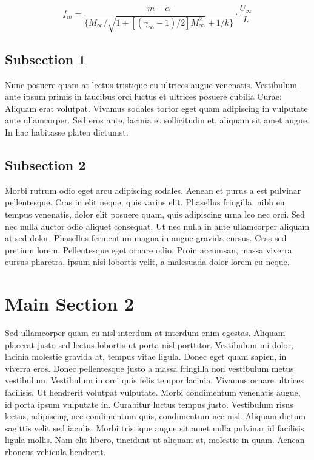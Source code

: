 \begin{equation}
f_m = \frac{m-\alpha}{\{M_{\infty}/\sqrt{1+[(\gamma_{\infty}-1)/2]M_{\infty}^2}+1/k\}} \cdot \frac{U_\infty}{L}
\label{eq:freq}
\end{equation}


\subsection{Subsection 1}

Nunc posuere quam at lectus tristique eu ultrices augue venenatis. Vestibulum ante ipsum primis in faucibus orci luctus et ultrices posuere cubilia Curae; Aliquam erat volutpat. Vivamus sodales tortor eget quam adipiscing in vulputate ante ullamcorper. Sed eros ante, lacinia et sollicitudin et, aliquam sit amet augue. In hac habitasse platea dictumst.


\subsection{Subsection 2}
Morbi rutrum odio eget arcu adipiscing sodales. Aenean et purus a est pulvinar pellentesque. Cras in elit neque, quis varius elit. Phasellus fringilla, nibh eu tempus venenatis, dolor elit posuere quam, quis adipiscing urna leo nec orci. Sed nec nulla auctor odio aliquet consequat. Ut nec nulla in ante ullamcorper aliquam at sed dolor. Phasellus fermentum magna in augue gravida cursus. Cras sed pretium lorem. Pellentesque eget ornare odio. Proin accumsan, massa viverra cursus pharetra, ipsum nisi lobortis velit, a malesuada dolor lorem eu neque.


\section{Main Section 2}

Sed ullamcorper quam eu nisl interdum at interdum enim egestas. Aliquam placerat justo sed lectus lobortis ut porta nisl porttitor. Vestibulum mi dolor, lacinia molestie gravida at, tempus vitae ligula. Donec eget quam sapien, in viverra eros. Donec pellentesque justo a massa fringilla non vestibulum metus vestibulum. Vestibulum in orci quis felis tempor lacinia. Vivamus ornare ultrices facilisis. Ut hendrerit volutpat vulputate. Morbi condimentum venenatis augue, id porta ipsum vulputate in. Curabitur luctus tempus justo. Vestibulum risus lectus, adipiscing nec condimentum quis, condimentum nec nisl. Aliquam dictum sagittis velit sed iaculis. Morbi tristique augue sit amet nulla pulvinar id facilisis ligula mollis. Nam elit libero, tincidunt ut aliquam at, molestie in quam. Aenean rhoncus vehicula hendrerit.

